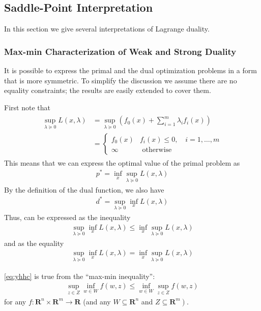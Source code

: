 \documentclass{article}
\begin{document}
\subsection{ Saddle-Point Interpretation}
In this section we give several interpretations of Lagrange duality.
\subsubsection{Max-min Characterization of Weak and Strong Duality}
It is possible to express the primal and the dual optimization problems in a form that is more symmetric. To simplify the discussion we assume there are no equality constraints; the results are easily extended to cover them.

First note that
\begin{align*}
\begin{aligned}
\sup _{\lambda \succeq 0} L(x, \lambda) &=\sup _{\lambda \succeq 0}\left(f_{0}(x)+\sum_{i=1}^{m} \lambda_{i} f_{i}(x)\right) \\
&= \begin{cases}f_{0}(x) & f_{i}(x) \leq 0, \quad i=1, \ldots, m \\
\infty & \text { otherwise }\end{cases}
\end{aligned}
\end{align*}
This means that we can express the optimal value of the primal problem as
\begin{align*}
p^* =\inf _{x} \sup _{\lambda \succeq 0} L(x, \lambda)
\end{align*}
By the definition of the dual function, we also have
\begin{align*}
d^* =\sup _{\lambda \succeq 0} \inf _{x} L(x, \lambda)
\end{align*}
Thus,  can be expressed as the inequality
\begin{align}
\sup _{\lambda \succeq 0} \underset{x}{\inf } L(x, \lambda) \leq \inf _{x} \sup _{\lambda \succeq 0} L(x, \lambda)\label{eq:yhhc}
\end{align}
and  as the equality
\begin{align}
\sup _{\lambda \succeq 0} \inf _{x} L(x, \lambda)=\inf _{x} \sup _{\lambda \succeq 0} L(x, \lambda)\label{eq:yhh1}
\end{align}


\cref{eq:yhhc} is  true from the ``max-min inequality'':
\begin{align}
\sup_{z \in Z} \inf_{w \in W} f(w, z) \leq \inf_{w \in W} \sup_{z \in Z} f(w, z)\label{eq:yjgvcm}
\end{align}
for any $f: \mathbf{R}^{n} \times \mathbf{R}^{m} \rightarrow \mathbf{R}$ (and any $W \subseteq \mathbf{R}^{n}$ and $\left.Z \subseteq \mathbf{R}^{m}\right)$.
\end{document}
